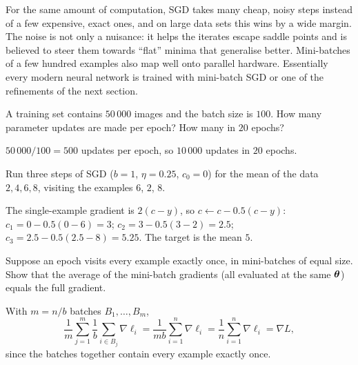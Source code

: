 \begin{mlnote}
For the same amount of computation, SGD takes many cheap, noisy steps instead of
a few expensive, exact ones, and on large data sets this wins by a wide margin.
The noise is not only a nuisance: it helps the iterates escape saddle points
and is believed to steer them towards ``flat'' minima that generalise better.
Mini-batches of a few hundred examples also map well onto parallel hardware.
Essentially every modern neural network is trained with mini-batch SGD or one of
the refinements of the next section.
\end{mlnote}

\sectionexercises

\begin{exercise}
A training set contains $50\,000$ images and the batch size is $100$. How many
parameter updates are made per epoch? How many in $20$ epochs?
\end{exercise}
\begin{solution}
$50\,000/100 = 500$ updates per epoch, so $10\,000$ updates in $20$ epochs.
\end{solution}

\begin{exercise}
Run three steps of SGD ($b = 1$, $\eta = 0.25$, $c_0 = 0$) for the mean of the
data $2, 4, 6, 8$, visiting the examples $6$, $2$, $8$.
\end{exercise}
\begin{solution}
The single-example gradient is $2(c - y)$, so $c \leftarrow c - 0.5(c - y)$:
$c_1 = 0 - 0.5(0 - 6) = 3$; $c_2 = 3 - 0.5(3 - 2) = 2.5$;
$c_3 = 2.5 - 0.5(2.5 - 8) = 5.25$. The target is the mean $5$.
\end{solution}

\begin{exercise}
Suppose an epoch visits every example exactly once, in mini-batches of equal
size. Show that the average of the mini-batch gradients (all evaluated at the
same $\bm{\theta}$) equals the full gradient.
\end{exercise}
\begin{solution}
With $m = n/b$ batches $B_1, \dots, B_m$,
\[
  \frac1m\sum_{j=1}^m\frac1b\sum_{i\in B_j}\nabla\ell_i
  = \frac{1}{mb}\sum_{i=1}^n\nabla\ell_i = \frac1n\sum_{i=1}^n\nabla\ell_i
  = \nabla L,
\]
since the batches together contain every example exactly once.
\end{solution}

